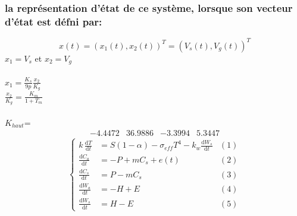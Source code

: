 \documentclass[12pt, a4paper, openany]{report}
\begin{document}
\subsubsection{la représentation d’état de ce système, lorsque son vecteur d’état est défni par:}

\begin{equation}
x(t)={(x_1(t),x_2(t))}^T={(V_s(t),V_g(t))}^T
\end{equation}
$x_1=V_s$ et $x_2=V_g$
\\\\


$x_1=\frac{K_s}{9p}\frac{x_2}{K_g}$\\
$\frac{x_2}{K_g}=\frac{K_m}{1+T_m}$
\\
\\
$K_{haut}$=
$$
\begin{matrix}
-4.4472 &  36.9886  & -3.3994 &   5.3447
\end{matrix} 
$$     
\begin{equation*}
      \left\{
         \begin{aligned}
           k\,\frac{\mathrm{d}T}{\mathrm{d}t}&=S(1-\alpha)-\sigma_{eff}T^4-k_w\frac{\mathrm{d}W_s}{\mathrm{d}t} & (1)\\
           \frac{\mathrm{d}C_a}{\mathrm{d}t}&=-P+mC_s+e(t) & (2) \\
           \frac{\mathrm{d}C_s}{\mathrm{d}t}&=P-mC_s & (3) \\
           \frac{\mathrm{d}W_a}{\mathrm{d}t}&=-H+E & (4) \\
           \frac{\mathrm{d}W_s}{\mathrm{d}t}&=H-E & (5)
         \end{aligned}
      \right.
    \end{equation*}


\end{document}
